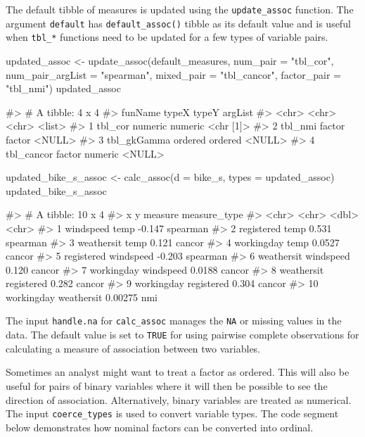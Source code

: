 The default tibble of measures is updated using the
\texttt{update\_assoc} function. The argument \texttt{default} has
\texttt{default\_assoc()} tibble as its default value and is useful when
\texttt{tbl\_*} functions need to be updated for a few types of variable
pairs.

\begin{Schunk}
\begin{Sinput}
updated_assoc <- update_assoc(default_measures,
                              num_pair = "tbl_cor",
                              num_pair_argList = "spearman",
                              mixed_pair = "tbl_cancor",
                              factor_pair = "tbl_nmi")
updated_assoc
\end{Sinput}
\begin{Soutput}
#> # A tibble: 4 x 4
#>   funName     typeX   typeY   argList  
#>   <chr>       <chr>   <chr>   <list>   
#> 1 tbl_cor     numeric numeric <chr [1]>
#> 2 tbl_nmi     factor  factor  <NULL>   
#> 3 tbl_gkGamma ordered ordered <NULL>   
#> 4 tbl_cancor  factor  numeric <NULL>
\end{Soutput}
\begin{Sinput}
updated_bike_s_assoc <- calc_assoc(d = bike_s, 
                                 types = updated_assoc)
updated_bike_s_assoc
\end{Sinput}
\begin{Soutput}
#> # A tibble: 10 x 4
#>    x          y           measure measure_type
#>    <chr>      <chr>         <dbl> <chr>       
#>  1 windspeed  temp       -0.147   spearman    
#>  2 registered temp        0.531   spearman    
#>  3 weathersit temp        0.121   cancor      
#>  4 workingday temp        0.0527  cancor      
#>  5 registered windspeed  -0.203   spearman    
#>  6 weathersit windspeed   0.120   cancor      
#>  7 workingday windspeed   0.0188  cancor      
#>  8 weathersit registered  0.282   cancor      
#>  9 workingday registered  0.304   cancor      
#> 10 workingday weathersit  0.00275 nmi
\end{Soutput}
\end{Schunk}

The input \texttt{handle.na} for \texttt{calc\_assoc} manages the
\texttt{NA} or missing values in the data. The default value is set to
\texttt{TRUE} for using pairwise complete observations for calculating a
measure of association between two variables.

Sometimes an analyst might want to treat a factor as ordered. This will
also be useful for pairs of binary variables where it will then be
possible to see the direction of association. Alternatively, binary
variables are treated as numerical. The input \texttt{coerce\_types} is
used to convert variable types. The code segment below demonstrates how
nominal factors can be converted into ordinal.

